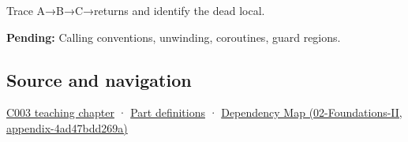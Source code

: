Trace A→B→C→returns and identify the dead local.

\textbf{Pending:} Calling conventions, unwinding, coroutines, guard regions.

\subsection{Source and navigation}\label{appendix-b081b7abe193-source-and-navigation}

\hyperref[01-foundations-i-ch002-where-the-bytes-live]{C003 teaching chapter} · \hyperref[appendix-fd090d982a15-m003---parts-41-60]{Part definitions} · \href{../02-Foundations-II/main.pdf\#nameddest=appendix-4ad47bdd269a}{Dependency Map (02-Foundations-II, appendix-4ad47bdd269a)}
